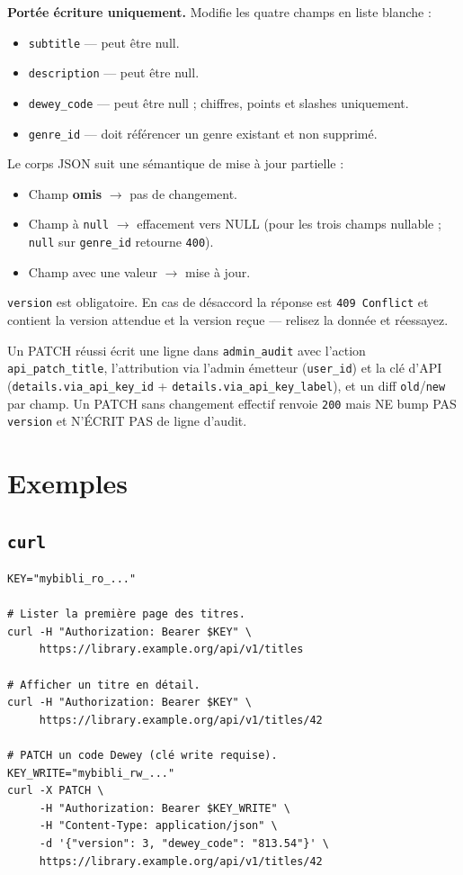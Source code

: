 \textbf{Portée écriture uniquement.} Modifie les quatre champs en
liste blanche :

\begin{itemize}
  \item \texttt{subtitle} — peut être null.
  \item \texttt{description} — peut être null.
  \item \texttt{dewey\_code} — peut être null ; chiffres, points
        et slashes uniquement.
  \item \texttt{genre\_id} — doit référencer un genre existant
        et non supprimé.
\end{itemize}

Le corps JSON suit une sémantique de mise à jour partielle :

\begin{itemize}
  \item Champ \textbf{omis} \(\rightarrow\) pas de changement.
  \item Champ à \texttt{null} \(\rightarrow\) effacement vers NULL
        (pour les trois champs nullable ; \texttt{null} sur
        \texttt{genre\_id} retourne \texttt{400}).
  \item Champ avec une valeur \(\rightarrow\) mise à jour.
\end{itemize}

\texttt{version} est obligatoire. En cas de désaccord la réponse
est \texttt{409 Conflict} et contient la version attendue et la
version reçue — relisez la donnée et réessayez.

Un PATCH réussi écrit une ligne dans \texttt{admin\_audit} avec
l'action \texttt{api\_patch\_title}, l'attribution via l'admin
émetteur (\texttt{user\_id}) et la clé d'API
(\texttt{details.via\_api\_key\_id} +
\texttt{details.via\_api\_key\_label}), et un diff
\texttt{old}/\texttt{new} par champ. Un PATCH sans changement
effectif renvoie \texttt{200} mais NE bump PAS \texttt{version} et
N'ÉCRIT PAS de ligne d'audit.

\section{Exemples}

\subsection{\texttt{curl}}

\begin{verbatim}
KEY="mybibli_ro_..."

# Lister la première page des titres.
curl -H "Authorization: Bearer $KEY" \
     https://library.example.org/api/v1/titles

# Afficher un titre en détail.
curl -H "Authorization: Bearer $KEY" \
     https://library.example.org/api/v1/titles/42

# PATCH un code Dewey (clé write requise).
KEY_WRITE="mybibli_rw_..."
curl -X PATCH \
     -H "Authorization: Bearer $KEY_WRITE" \
     -H "Content-Type: application/json" \
     -d '{"version": 3, "dewey_code": "813.54"}' \
     https://library.example.org/api/v1/titles/42
\end{verbatim}

